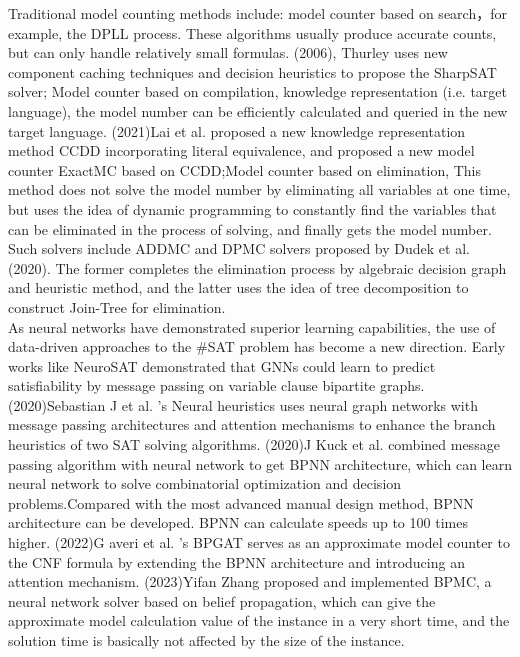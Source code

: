Traditional model counting methods include: model counter based on search，for example, 
the DPLL process. These algorithms usually produce accurate counts, but can only handle 
relatively small formulas. (2006), Thurley uses new component caching techniques and 
decision heuristics to propose the SharpSAT solver\cite{DBLP:conf/sat/Thurley06}; 
Model counter based on compilation, knowledge representation (i.e. target language), 
the model number can be efficiently calculated and queried in the new target language.  
(2021)Lai et al. proposed a new knowledge representation method CCDD
\cite{DBLP:journals/corr/abs-2202-10025} incorporating literal equivalence, and proposed
a new model counter ExactMC\cite{DBLP:conf/aaai/LaiMY21} based on CCDD;Model counter based 
on elimination, This method does not solve the model number by eliminating all variables 
at one time, but uses the idea of dynamic programming to constantly find the variables 
that can be eliminated in the process of solving, and finally gets the model number. Such 
solvers include ADDMC\cite{DBLP:conf/aaai/DudekPV20} and DPMC\cite{DBLP:conf/aaai/LaiMY21} 
solvers proposed by Dudek et al. (2020). The former completes the elimination process by 
algebraic decision graph and heuristic method, and the latter uses the idea of tree 
decomposition to construct Join-Tree for elimination.\\

As neural networks have demonstrated superior learning capabilities, the use of data-driven 
approaches to the \#SAT problem has become a new direction. Early works like NeuroSAT
\cite{DBLP:conf/iclr/SelsamLBLMD19} demonstrated that GNNs could learn to predict satisfiability 
by message passing on  variable clause bipartite graphs. (2020)Sebastian J et al. 's Neural 
heuristics\cite{DBLP:journals/corr/abs-2012-14873} uses neural graph networks with message 
passing architectures and attention mechanisms to enhance the branch heuristics of two SAT 
solving algorithms. (2020)J Kuck et al. combined message passing algorithm with neural network 
to get BPNN architecture, which can learn neural network to solve combinatorial optimization and 
decision problems.Compared with the most advanced manual design method, BPNN architecture can 
be developed. BPNN can calculate speeds up to 100 times higher. (2022)G averi et al. 's BPGAT
\cite{DBLP:conf/esann/Saveri22} serves as an approximate model counter to the CNF formula by 
extending the BPNN architecture and introducing an attention mechanism. (2023)Yifan Zhang proposed 
and implemented BPMC\cite{1023549391.nh}, a neural network solver based on belief propagation, 
which can give the approximate model calculation value of the instance in a very short time, and 
the solution time is basically not affected by the size of the instance.
